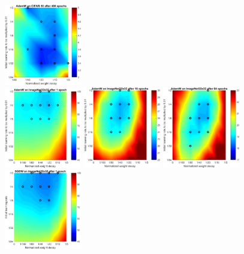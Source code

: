 \documentclass[usenames,dvipsnames]{article} %
\newcommand{\note}[1]{
	\noindent~\\
	\vspace{0.25cm}
	\fcolorbox{red}{yellow}{\parbox{0.97\textwidth}{#1\\}}
	\vspace{0.25cm}
}
\begin{document}
\begin{figure}[p]
\begin{center}
  \includegraphics[width=0.3\textwidth]{sfig2_ADAMW_400.pdf}\\
	\includegraphics[width=0.3\textwidth]{sfig2_ADAMWR_1.pdf}
  \includegraphics[width=0.3\textwidth]{sfig2_ADAMWR_16.pdf}
  \includegraphics[width=0.3\textwidth]{sfig2_ADAMWR_64.pdf}\\
  \includegraphics[width=0.3\textwidth]{sfig2_SGDWR_1.pdf}

\end{center}
\end{figure}
\end{document}
